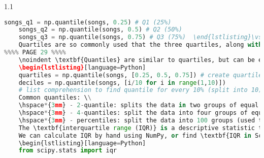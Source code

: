 \documentclass[11pt, a4paper]{article}
\begin{document}
\begin{spacing}{1.1}
\begin{lstlisting}[language=Python]
	songs_q1 = np.quantile(songs, 0.25) # Q1 (25%)
	songs_q2 = np.quantile(songs, 0.5) # Q2 (50%)
	songs_q3 = np.quantile(songs, 0.75) # Q3 (75%)	\end{lstlisting}\vspace*{1mm}
	Quartiles are so commonly used that the three quartiles, along with the minimum and maximum values of a dataset, are called the \textbf{five-number summary of the dataset}. These help you quickly get a sense of the range, centrality, and spread of the dataset. \newpage
	\noindent \textbf{Quantiles} are similar to quartiles, but can be expressed as any number (not just split into four). If you have \textit{n} quantiles, it will split the data into \textit{n+1} groups of equal size. Similar to above, we will use NumPy's \textit{np.quantile( )} function to separate the data. To evenly separate the data into multiple quantiles, we pass a list as our parameter. 
	\begin{lstlisting}[language=Python]
	quartiles = np.quantile(songs, [0.25, 0.5, 0.75]) # create quartiles (split into 4)
	deciles = np.quantile(songs, [i/10 for i in range(1,10)]) 
	# list comprehension to find quantile for every 10% (split into 10) \end{lstlisting}\vspace*{1mm}
	Common quantiles: \\
	\hspace*{3mm} - 2-quantile: splits the data in two groups of equal size (also known as the median). \\
	\hspace*{3mm} - 4-quantiles: split the data into four groups of equal size (also known as quartiles). \\
	\hspace*{3mm} - percentiles: split the data into 100 groups (used to compare new data points to dataset). \\~\\
	The \textbf{interquartile range (IQR)} is a descriptive statistic that tries to solve the problem of outliers affecting our range of a dataset. The IQR ignores the tails of the dataset, so you know the range around-which your data is centered. The IQR is the difference between Q3 and Q1 (the middle 50\%). \vspace*{1mm} \\
	We can calculate IQR by hand using NumPy, or find \textbf{IQR in SciPy} by using the \textit{iqr( )} function. Note that IQR is robust, meaning outliers have little impact on it, so two datasets IQR can be identical even with different outliers.
	\begin{lstlisting}[language=Python]
	from scipy.stats import iqr
	

\end{lstlisting}
\end{spacing}
\end{document}
